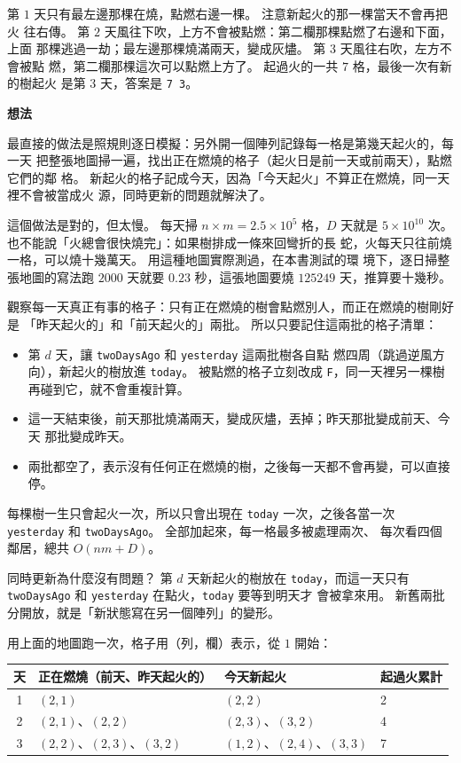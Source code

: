 第 $1$ 天只有最左邊那棵在燒，點燃右邊一棵。 注意新起火的那一棵當天不會再把火
往右傳。 第 $2$ 天風往下吹，上方不會被點燃：第二欄那棵點燃了右邊和下面，上面
那棵逃過一劫；最左邊那棵燒滿兩天，變成灰燼。 第 $3$ 天風往右吹，左方不會被點
燃，第二欄那棵這次可以點燃上方了。 起過火的一共 $7$ 格，最後一次有新的樹起火
是第 $3$ 天，答案是 \texttt{7 3}。

\textbf{想法}

最直接的做法是照規則逐日模擬：另外開一個陣列記錄每一格是第幾天起火的，每一天
把整張地圖掃一遍，找出正在燃燒的格子（起火日是前一天或前兩天），點燃它們的鄰
格。 新起火的格子記成今天，因為「今天起火」不算正在燃燒，同一天裡不會被當成火
源，同時更新的問題就解決了。

這個做法是對的，但太慢。 每天掃 $n \times m = 2.5 \times 10^5$ 格，$D$ 天就是
$5 \times 10^{10}$ 次。 也不能說「火總會很快燒完」：如果樹排成一條來回彎折的長
蛇，火每天只往前燒一格，可以燒十幾萬天。 用這種地圖實際測過，在本書測試的環
境下，逐日掃整張地圖的寫法跑 $2000$ 天就要 $0.23$ 秒，這張地圖要燒
$125249$ 天，推算要十幾秒。

觀察每一天真正有事的格子：只有正在燃燒的樹會點燃別人，而正在燃燒的樹剛好是
「昨天起火的」和「前天起火的」兩批。 所以只要記住這兩批的格子清單：

\begin{itemize}
\item 第 $d$ 天，讓 \texttt{twoDaysAgo} 和 \texttt{yesterday} 這兩批樹各自點
燃四周（跳過逆風方向），新起火的樹放進 \texttt{today}。 被點燃的格子立刻改成
\texttt{F}，同一天裡另一棵樹再碰到它，就不會重複計算。
\item 這一天結束後，前天那批燒滿兩天，變成灰燼，丟掉；昨天那批變成前天、今天
那批變成昨天。
\item 兩批都空了，表示沒有任何正在燃燒的樹，之後每一天都不會再變，可以直接停。
\end{itemize}

每棵樹一生只會起火一次，所以只會出現在 \texttt{today} 一次，之後各當一次
\texttt{yesterday} 和 \texttt{twoDaysAgo}。 全部加起來，每一格最多被處理兩次、
每次看四個鄰居，總共 $O(nm + D)$。

同時更新為什麼沒有問題？ 第 $d$ 天新起火的樹放在 \texttt{today}，而這一天只有
\texttt{twoDaysAgo} 和 \texttt{yesterday} 在點火，\texttt{today} 要等到明天才
會被拿來用。 新舊兩批分開放，就是「新狀態寫在另一個陣列」的變形。

用上面的地圖跑一次，格子用（列，欄）表示，從 $1$ 開始：

\begin{center}
\begin{tabular}{clll}
\toprule
天 & 正在燃燒（前天、昨天起火的） & 今天新起火 & 起過火累計 \\
\midrule
1 & $(2,1)$ & $(2,2)$ & 2 \\
2 & $(2,1)$、$(2,2)$ & $(2,3)$、$(3,2)$ & 4 \\
3 & $(2,2)$、$(2,3)$、$(3,2)$ & $(1,2)$、$(2,4)$、$(3,3)$ & 7 \\
\bottomrule
\end{tabular}
\end{center}

